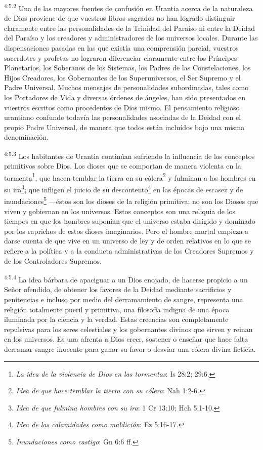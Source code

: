\par
\textsuperscript{4:5.2} Una de las mayores fuentes de confusión en Urantia acerca de la naturaleza de Dios proviene de que vuestros libros sagrados no han logrado distinguir claramente entre las personalidades de la Trinidad del Paraíso ni entre la Deidad del Paraíso y los creadores y administradores de los universos locales. Durante las dispensaciones pasadas en las que existía una comprensión parcial, vuestros sacerdotes y profetas no lograron diferenciar claramente entre los Príncipes Planetarios, los Soberanos de los Sistemas, los Padres de las Constelaciones, los Hijos Creadores, los Gobernantes de los Superuniversos, el Ser Supremo y el Padre Universal. Muchos mensajes de personalidades subordinadas, tales como los Portadores de Vida y diversas órdenes de ángeles, han sido presentados en vuestros escritos como procedentes de Dios mismo. El pensamiento religioso urantiano confunde todavía las personalidades asociadas de la Deidad con el propio Padre Universal, de manera que todos están incluídos bajo una misma denominación.

\par
\textsuperscript{4:5.3} Los habitantes de Urantia continúan sufriendo la influencia de los conceptos primitivos sobre Dios. Los dioses que se comportan de manera violenta en la tormenta\footnote{\textit{La idea de la violencia de Dios en las tormentas}: Is 28:2; 29:6.}, que hacen temblar la tierra en su cólera\footnote{\textit{Idea de que hace temblar la tierra con su cólera}: Nah 1:2-6.} y fulminan a los hombres en su ira\footnote{\textit{Idea de que fulmina hombres con su ira}: 1 Cr 13:10; Hch 5:1-10.}; que infligen el juicio de su descontento\footnote{\textit{Idea de las calamidades como maldición}: Ez 5:16-17.} en las épocas de escasez y de inundaciones\footnote{\textit{Inundaciones como castigo}: Gn 6:6 ff.} ---éstos son los dioses de la religión primitiva; no son los Dioses que viven y gobiernan en los universos. Estos conceptos son una reliquia de los tiempos en que los hombres suponían que el universo estaba dirigido y dominado por los caprichos de estos dioses imaginarios. Pero el hombre mortal empieza a darse cuenta de que vive en un universo de ley y de orden relativos en lo que se refiere a la política y a la conducta administrativas de los Creadores Supremos y de los Controladores Supremos.

\par
\textsuperscript{4:5.4} La idea bárbara de apaciguar a un Dios enojado, de hacerse propicio a un Señor ofendido, de obtener los favores de la Deidad mediante sacrificios y penitencias e incluso por medio del derramamiento de sangre, representa una religión totalmente pueril y primitiva, una filosofía indigna de una época iluminada por la ciencia y la verdad. Estas creencias son completamente repulsivas para los seres celestiales y los gobernantes divinos que sirven y reinan en los universos. Es una afrenta a Dios creer, sostener o enseñar que hace falta derramar sangre inocente para ganar su favor o desviar una cólera divina ficticia.

